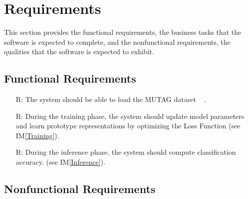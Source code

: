 \documentclass[12pt]{article}
\newcommand{\iref}[1]{IM\ref{#1}}
\newcounter{reqnum} %
\begin{document}
\section{Requirements}

This section provides the functional requirements, the business tasks that the
software is expected to complete, and the nonfunctional requirements, the
qualities that the software is expected to exhibit.

\subsection{Functional Requirements}

\noindent \begin{itemize}

\item[R\refstepcounter{reqnum}\thereqnum \label{R_Inputs}:] The system should be able to load the MUTAG dataset ~\citep{debnath1991structure} .

\item[R\refstepcounter{reqnum}\thereqnum \label{R_Train}:] During the training phase, the system should update model parameters and learn prototype representations by optimizing the Loss Function (see \iref{Training}).

\item[R\refstepcounter{reqnum}\thereqnum \label{R_VerifyOutput}:] During the inference phase, the system should compute classification accuracy. (see \iref{Inference}).


\end{itemize}


\subsection{Nonfunctional Requirements}
\end{document}
